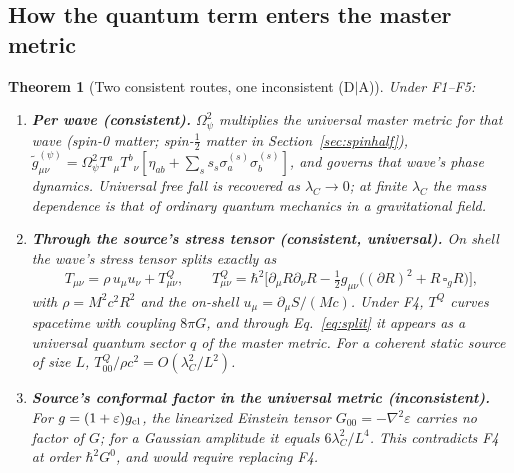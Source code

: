 \documentclass[11pt,a4paper]{article}
\newtheorem{theorem}{Theorem}[section]
\begin{document}
\subsection{How the quantum term enters the master metric}
\begin{theorem}[Two consistent routes, one inconsistent (D$\mid$A)]\label{thm:routes}
Under F1--F5:
\begin{enumerate}
\item \textbf{Per wave (consistent).} $\Omega_\psi^2$ multiplies the universal
master metric for that wave (spin-0 matter; spin-$\frac12$ matter in
Section~\ref{sec:spinhalf}),
$\tilde g^{(\psi)}_{\mu\nu}=\Omega_\psi^2T^a{}_\mu T^b{}_\nu[\eta_{ab}+\sum_ss_s\sigma^{(s)}_a\sigma^{(s)}_b]$,
and governs that wave's phase dynamics. Universal free fall is recovered as
$\lambda_C\to0$; at finite $\lambda_C$ the mass dependence is that of ordinary
quantum mechanics in a gravitational field.
\item \textbf{Through the source's stress tensor (consistent, universal).} On
shell the wave's stress tensor splits exactly as
\begin{equation}\label{eq:TQ}
T_{\mu\nu}=\rho\,u_\mu u_\nu+T^Q_{\mu\nu},\qquad
T^Q_{\mu\nu}=\hbar^2\bigl[\partial_\mu R\partial_\nu R-\tfrac12g_{\mu\nu}\bigl((\partial R)^2+R\,\square_gR\bigr)\bigr],
\end{equation}
with $\rho=M^2c^2R^2$ and the on-shell $u_\mu=\partial_\mu S/(Mc)$. Under F4, $T^Q$
curves spacetime with coupling $8\pi G$, and through Eq.~\eqref{eq:split} it
appears as a universal quantum sector $q$ of the master metric. For a coherent
static source of size $L$, $T^Q_{00}/\rho c^2=O(\lambda_C^2/L^2)$.
\item \textbf{Source's conformal factor in the universal metric (inconsistent).}
For $g=(1+\varepsilon)g_{\rm cl}$, the linearized Einstein tensor
$G_{00}=-\nabla^2\varepsilon$ carries no factor of $G$; for a Gaussian amplitude it
equals $6\lambda_C^2/L^4$. This contradicts F4 at order $\hbar^2G^0$, and would
require replacing F4.
\end{enumerate}
\end{theorem}
\end{document}
